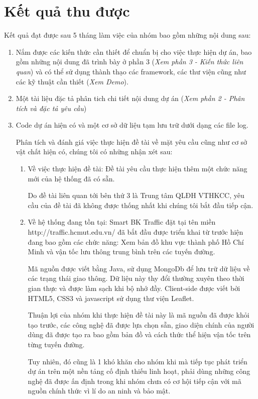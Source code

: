 \section{Kết quả thu được}
Kết quả đạt được sau 5 tháng làm việc của nhóm bao gồm những nội dung sau:
\begin{enumerate}
	\item Nắm được các kiến thức cần thiết để chuẩn bị cho việc thực hiện dự án, bao gồm những nội dung đã trình bày ở phần 3 (\textit{Xem phần 3 - Kiến thức liên quan}) và có thể sử dụng thành thạo các framework, các thư viện cũng như các kỹ thuật cần thiết (\textit{Xem Demo}).
	\item Một tài liệu đặc tả phân tich chi tiết nội dung dự án 
	(\textit{Xem phần 2 - Phân tích và đặc tả yêu cầu})
	
	\item Code dự án hiện có và một cơ sở dữ liệu tạm lưu trữ dưới dạng các file log.
	
	 Phân tích và đánh giá việc thực hiện đề tài về mặt yêu cầu cũng như cơ sở vật chất hiện có, chúng tôi có những nhận xét sau:
	
	\begin{enumerate}

		\item Về việc thực hiện đề tài:
		Đề tài yêu cầu thực hiện thêm một chức năng mới của hệ thống đã có sẵn.
		
		Do đề tài liên quan tới bên thứ 3 là Trung tâm QLĐH VTHKCC, yêu cầu của đề tài đã không được thống nhất khi chúng tôi bắt đầu tiếp cận. 

		\item Về hệ thống đang tồn tại:
		Smart BK Traffic đặt tại tên miền http://traffic.hcmut.edu.vn/ đã bắt đầu được triển khai từ trước hiện đang bao gồm các chức năng: Xem bản đồ khu vực thành phố Hồ Chí Minh và vận tốc lưu thông trung bình trên các tuyến đường.
		
		Mã nguồn được viết bằng Java, sử dụng MongoDb để lưu trữ dữ liệu về các trạng thái giao thông. Dữ liệu này thy đổi thường xuyên theo thời gian thực và được làm sạch khi bộ nhớ đầy. Client-side được viết bởi HTML5, CSS3 và javascript sử dụng thư viện Leaflet. 
		
		Thuận lợi của nhóm khi thực hiện đề tài này là mã nguồn đã được khỏi tạo trước, các công nghệ đã được lựa chọn sẵn, giao diện chính của người dùng đã được tạo ra bao gồm bản đồ và cách thức thể hiện vận tốc trên từng tuyến đường.
		
		Tuy nhiên, đó cũng là 1 khó khăn cho nhóm khi mà tiếp tục phát triển dự án trên một nền tảng cố định thiếu linh hoạt, phải dùng những công nghệ đã được ấn định trong khi nhóm chưa có cơ hội tiếp cận với mã nguồn chính thức vì lí do an ninh và bảo mật.
		

\end{enumerate}
\end{enumerate}
